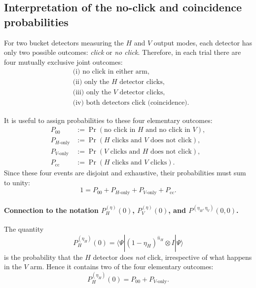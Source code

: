 \documentclass[%
 reprint,
 amsmath,amssymb,
 aps,
twocolumn
]{revtex4-2}
\begin{document}
\subsection*{Interpretation of the no-click and coincidence probabilities}

For two bucket detectors measuring the $H$ and $V$ output modes, each detector has only two possible outcomes:
\emph{click} or \emph{no click}. Therefore, in each trial there are four mutually exclusive joint outcomes:
\begin{align}
&\text{(i) no click in either arm}, \nonumber\\
&\text{(ii) only the $H$ detector clicks}, \nonumber\\
&\text{(iii) only the $V$ detector clicks}, \nonumber\\
&\text{(iv) both detectors click (coincidence).} \nonumber
\end{align}

It is useful to assign probabilities to these four elementary outcomes:
\begin{align}
P_{00} &:= \Pr(\text{no click in $H$ and no click in $V$}),\\
P_{H\text{-only}} &:= \Pr(\text{$H$ clicks and $V$ does not click}),\\
P_{V\text{-only}} &:= \Pr(\text{$V$ clicks and $H$ does not click}),\\
P_{\mathrm{cc}} &:= \Pr(\text{$H$ clicks and $V$ clicks}).
\end{align}
Since these four events are disjoint and exhaustive, their probabilities must sum to unity:
\begin{equation}
1 = P_{00} + P_{H\text{-only}} + P_{V\text{-only}} + P_{\mathrm{cc}}.
\label{eq:four_outcomes_sum}
\end{equation}

\paragraph{Connection to the notation $P_H^{(\eta)}(0)$, $P_V^{(\eta)}(0)$, and $P^{(\eta_H,\eta_V)}(0,0)$.}

The quantity
\begin{equation}
P_H^{(\eta_H)}(0)
=
\langle \Psi | (1-\eta_H)^{\hat n_H}\otimes I |\Psi\rangle
\end{equation}
is the probability that the $H$ detector does \emph{not} click, irrespective of what happens in the $V$ arm. Hence it contains two of the four elementary outcomes:
\begin{equation}
P_H^{(\eta_H)}(0) = P_{00} + P_{V\text{-only}}.
\label{eq:PH_meaning}
\end{equation}
\end{document}
